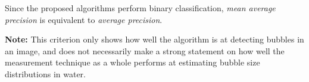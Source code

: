 		Since the proposed algorithms perform binary classification, \textit{mean average precision} is equivalent to \textit{average precision}. 
		
		\textbf{Note:} This criterion only shows how well the algorithm is at detecting bubbles in an image, and does not necessarily make a strong statement on how well the measurement technique as a whole performs at estimating bubble size distributions in water. 
		
		 



































